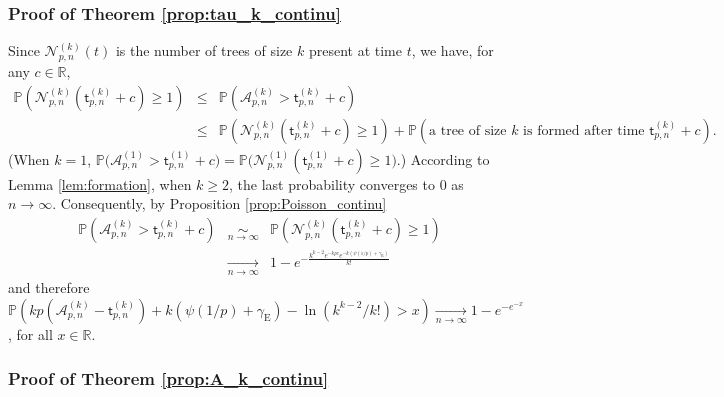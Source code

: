 \documentclass[a4, 11pt]{article}
\numberwithin{equation}{section}
\theoremstyle{plain}
\theoremstyle{definition}
\theoremstyle{remark}
\begin{document}
\subsubsection{Proof of Theorem \ref{prop:tau_k_continu}}

Since $\mathcal N_{p,n}^{(k)}(t)$ is the number of trees of size $k$ present at time $t$, we have, for any $c \in \mathbb R$, 
\begin{eqnarray*}
\mathbb P\left(\mathcal N_{p,n}^{(k)}(\mathsf t^{(k)}_{p,n}+c) \geq 1 \right) &\leq& \mathbb P\left(\mathcal A_{p,n}^{(k)} > \mathsf t^{(k)}_{p,n} +c \right) \\
&\leq& \mathbb P\left(\mathcal N_{p,n}^{(k)}(\mathsf t^{(k)}_{p,n}+c) \geq 1\right) + \mathbb P\left(\text{a tree of size $k$ is formed after time }\mathsf t^{(k)}_{p,n}+c\right).
\end{eqnarray*}
(When $k=1$, $\mathbb P\big(\mathcal A_{p,n}^{(1)} > \mathsf t^{(1)}_{p,n} +c \big)= \mathbb P\big(\mathcal N_{p,n}^{(1)}(\mathsf t^{(1)}_{p,n}+c)\geq 1\big)$.)
According to Lemma \ref{lem:formation}, when $k\geq 2$, the last probability converges to 0 as $n \rightarrow \infty$. Consequently, by Proposition \ref{prop:Poisson_continu}
\begin{eqnarray*}
 \mathbb P\left(\mathcal A_{p,n}^{(k)} > \mathsf t^{(k)}_{p,n} +c \right) &\underset{n \rightarrow \infty}\sim& \mathbb P\left(\mathcal N_{p,n}^{(k)}(\mathsf t^{(k)}_{p,n}+c) \geq 1 \right) \\
&\underset{n \rightarrow \infty}\rightarrow &  1-e^{-\frac{k^{k-2}e^{-kpc} e^{-k\left(\psi(1/p)+\gamma_{\mathrm E}\right)}}{k!}}
\end{eqnarray*}
and therefore $ \mathbb P\left(kp(\mathcal A_{p,n}^{(k)} - \mathsf t^{(k)}_{p,n} )+k\left(\psi(1/p)+\gamma_{\mathrm E}\right)-\ln (k^{k-2}/k!) >x\right) \underset{n \rightarrow \infty}\rightarrow 1-e^{-e^{-x}}$, for all $x \in \mathbb R$.


\subsubsection{Proof of Theorem \ref{prop:A_k_continu}}
\end{document}
